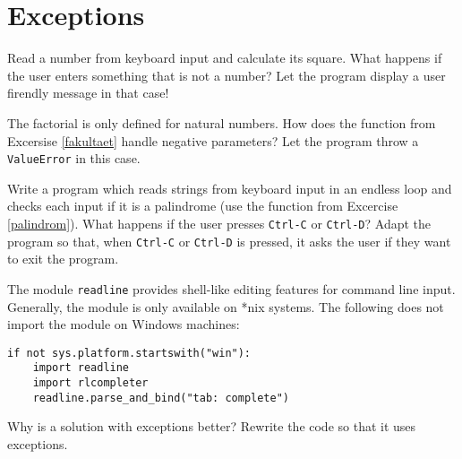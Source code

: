 \section*{Exceptions}
\begin{aufgabe}

Read a number from keyboard input and calculate its square. What happens if the 
user enters something that is not a number? Let the program display a user firendly message in that case!
\end{aufgabe}

\begin{aufgabe}
The factorial is only defined for natural numbers. How does the function from Excersise \ref{fakultaet} handle negative parameters? Let the program throw a \texttt{ValueError} in this case.
\end{aufgabe}

\begin{aufgabe}
Write a program which reads strings from keyboard input in an endless loop and checks each input if it is a palindrome (use the function from Excercise \ref{palindrom}). What happens if the user presses \texttt{Ctrl-C} or \texttt{Ctrl-D}? Adapt the program so that, when \texttt{Ctrl-C} or \texttt{Ctrl-D} is pressed, it asks the user if they want to exit the program.
\end{aufgabe}

\begin{aufgabe}
The module \texttt{readline} provides shell-like editing features for command line input. Generally, the module is only available on *nix systems. The following does not import the module on Windows machines:
\begin{lstlisting}
if not sys.platform.startswith("win"):
    import readline
    import rlcompleter
    readline.parse_and_bind("tab: complete")
\end{lstlisting}
Why is a solution with exceptions better? Rewrite the code so that it uses exceptions.
\end{aufgabe}

